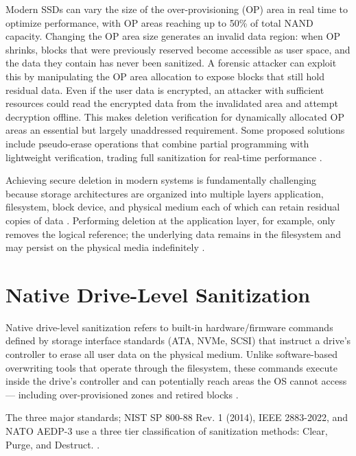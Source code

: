 Modern SSDs can vary the size of the over-provisioning (OP) area in real time to optimize 
performance, with OP areas reaching up to 50\% of total NAND capacity. Changing the OP area size 
generates an invalid data region: when OP shrinks, blocks that were previously reserved become 
accessible as user space, and the data they contain has never been sanitized. A forensic attacker 
can exploit this by manipulating the OP area allocation to expose blocks that still hold residual 
data. Even if the user data is encrypted, an attacker with sufficient resources could read the 
encrypted data from the invalidated area and attempt decryption offline. This makes deletion 
verification for dynamically allocated OP areas an essential but largely unaddressed requirement. 
Some proposed solutions include pseudo-erase operations that combine partial programming with 
lightweight verification, trading full sanitization for real-time performance \cite{ahn2021forensics}.

Achieving secure deletion in modern systems is fundamentally challenging because storage architectures are organized
into multiple layers application, filesystem, block device, and physical medium each of which can retain residual 
copies of data \cite{duplicateschen2022}. Performing deletion at the application layer, for example, only removes the 
logical reference; the underlying data remains in the filesystem and may persist on the physical media indefinitely \cite{zhang2018ensuring}.


\section{Native Drive-Level Sanitization}

Native drive-level sanitization refers to built-in hardware/firmware commands defined by storage 
interface standards (ATA, NVMe, SCSI) that instruct a drive's controller to erase all user data on 
the physical medium. Unlike software-based overwriting tools that operate through the filesystem, 
these commands execute inside the drive's controller and can potentially reach areas the OS cannot 
access — including over-provisioned zones and retired blocks \cite{antiforensics2016}. 

The three major standards; NIST SP 800-88 Rev. 1 (2014), IEEE 2883-2022, and NATO AEDP-3 use a three 
tier classification of sanitization methods: Clear, Purge, and Destruct. \cite{aronsson2025secure}.

